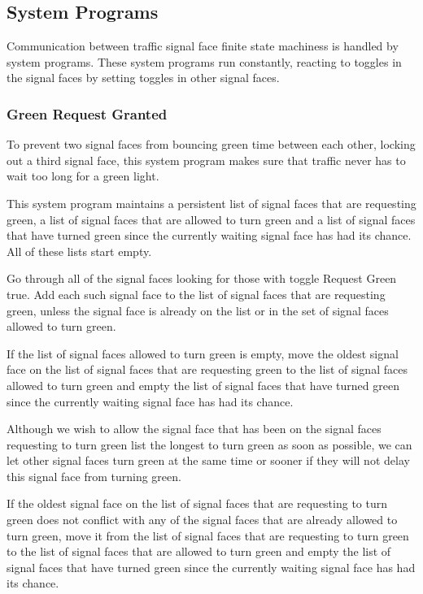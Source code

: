 \documentclass[letterpaper,twoside]{article}
\begin{document}
\subsection{System Programs}

Communication between traffic signal face finite state machiness is handled by
system programs.
These system programs run constantly, reacting to toggles in the
signal faces by setting toggles in other signal faces.

\subsubsection{Green Request Granted}

To prevent two signal faces from bouncing green time between each other,
locking out a third signal face, this system program makes sure that
traffic never has to wait too long for a green light.

This system program maintains a persistent list of signal faces that are
requesting green,
a list of signal faces that are allowed to turn green and a list of signal
faces that have turned green since the currently waiting signal face
has had its chance.
All of these lists start empty.

Go through all of the signal faces looking for those with toggle Request
Green true.  Add each such signal face to the list of
signal faces that are requesting green, unless the signal face is already on
the list or in the set of signal faces allowed to turn green.

If the list of signal faces allowed to turn green is empty, move the
oldest signal face on the list of signal faces that are requesting
green to the list of signal faces allowed to turn green and empty the list
of signal faces that have turned green since the currently waiting
signal face has had its chance.

Although we wish to allow the signal face that has been on the
signal faces requesting to turn green list the longest to turn green
as soon as possible, we can let other signal faces turn green
at the same time or sooner if they will not delay this signal face
from turning green.

If the oldest signal face on the list of signal faces that are
requesting to turn green does not conflict with any of the signal
faces that are already allowed to turn green, move it from the
list of signal faces that are requesting to turn green to the list
of signal faces that are allowed to turn green and empty the list
of signal faces that have turned green since the currently waiting
signal face has had its chance.
\end{document}
